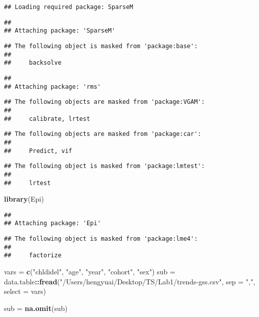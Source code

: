 \documentclass[]{article}
\newenvironment{Shaded}{\begin{snugshade}}{\end{snugshade}}
\newcommand{\DataTypeTok}[1]{\textcolor[rgb]{0.13,0.29,0.53}{#1}}
\newcommand{\KeywordTok}[1]{\textcolor[rgb]{0.13,0.29,0.53}{\textbf{#1}}}
\newcommand{\NormalTok}[1]{#1}
\newcommand{\OperatorTok}[1]{\textcolor[rgb]{0.81,0.36,0.00}{\textbf{#1}}}
\newcommand{\StringTok}[1]{\textcolor[rgb]{0.31,0.60,0.02}{#1}}
\begin{document}
\begin{verbatim}
## Loading required package: SparseM
\end{verbatim}

\begin{verbatim}
## 
## Attaching package: 'SparseM'
\end{verbatim}

\begin{verbatim}
## The following object is masked from 'package:base':
## 
##     backsolve
\end{verbatim}

\begin{verbatim}
## 
## Attaching package: 'rms'
\end{verbatim}

\begin{verbatim}
## The following objects are masked from 'package:VGAM':
## 
##     calibrate, lrtest
\end{verbatim}

\begin{verbatim}
## The following objects are masked from 'package:car':
## 
##     Predict, vif
\end{verbatim}

\begin{verbatim}
## The following object is masked from 'package:lmtest':
## 
##     lrtest
\end{verbatim}

\begin{Shaded}
\begin{Highlighting}[]
\KeywordTok{library}\NormalTok{(Epi)}
\end{Highlighting}
\end{Shaded}

\begin{verbatim}
## 
## Attaching package: 'Epi'
\end{verbatim}

\begin{verbatim}
## The following object is masked from 'package:lme4':
## 
##     factorize
\end{verbatim}

\begin{Shaded}
\begin{Highlighting}[]
\NormalTok{vars =}\StringTok{ }\KeywordTok{c}\NormalTok{(}\StringTok{"chldidel"}\NormalTok{, }\StringTok{"age"}\NormalTok{, }\StringTok{"year"}\NormalTok{, }\StringTok{"cohort"}\NormalTok{, }\StringTok{"sex"}\NormalTok{)}
\NormalTok{sub =}\StringTok{ }\NormalTok{data.table}\OperatorTok{::}\KeywordTok{fread}\NormalTok{(}\StringTok{"/Users/hengyuai/Desktop/TS/Lab1/trends-gss.csv"}\NormalTok{,}
                        \DataTypeTok{sep =} \StringTok{","}\NormalTok{,}
                        \DataTypeTok{select =}\NormalTok{ vars)}

\NormalTok{sub =}\StringTok{ }\KeywordTok{na.omit}\NormalTok{(sub)}
\end{Highlighting}
\end{Shaded}
\end{document}
